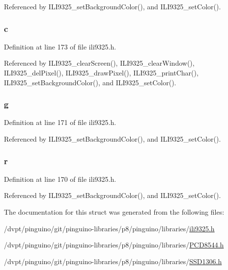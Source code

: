 Referenced by I\-L\-I9325\-\_\-set\-Background\-Color(), and I\-L\-I9325\-\_\-set\-Color().

\hypertarget{structcolor__t_afff0ae4fe505f5b27afed49e21dea41d}{
\subsubsection[{c}]{ c}}\label{structcolor__t_afff0ae4fe505f5b27afed49e21dea41d}


Definition at line 173 of file ili9325.\-h.



Referenced by I\-L\-I9325\-\_\-clear\-Screen(), I\-L\-I9325\-\_\-clear\-Window(), I\-L\-I9325\-\_\-del\-Pixel(), I\-L\-I9325\-\_\-draw\-Pixel(), I\-L\-I9325\-\_\-print\-Char(), I\-L\-I9325\-\_\-set\-Background\-Color(), and I\-L\-I9325\-\_\-set\-Color().

\hypertarget{structcolor__t_a2e3999b42bd5cf9f9e7d87ef7c135544}{
\subsubsection[{g}]{ g}}\label{structcolor__t_a2e3999b42bd5cf9f9e7d87ef7c135544}


Definition at line 171 of file ili9325.\-h.



Referenced by I\-L\-I9325\-\_\-set\-Background\-Color(), and I\-L\-I9325\-\_\-set\-Color().

\hypertarget{structcolor__t_a024565753c9b4a462348578bb2fe6757}{
\subsubsection[{r}]{ r}}\label{structcolor__t_a024565753c9b4a462348578bb2fe6757}


Definition at line 170 of file ili9325.\-h.



Referenced by I\-L\-I9325\-\_\-set\-Background\-Color(), and I\-L\-I9325\-\_\-set\-Color().



The documentation for this struct was generated from the following files\-:\begin{DoxyCompactItemize}
\item 
/dvpt/pinguino/git/pinguino-\/libraries/p8/pinguino/libraries/\hyperlink{ili9325_8h}{ili9325.\-h}\item 
/dvpt/pinguino/git/pinguino-\/libraries/p8/pinguino/libraries/\hyperlink{p8_2pinguino_2libraries_2_p_c_d8544_8h}{P\-C\-D8544.\-h}\item 
/dvpt/pinguino/git/pinguino-\/libraries/p8/pinguino/libraries/\hyperlink{p8_2pinguino_2libraries_2_s_s_d1306_8h}{S\-S\-D1306.\-h}\end{DoxyCompactItemize}
